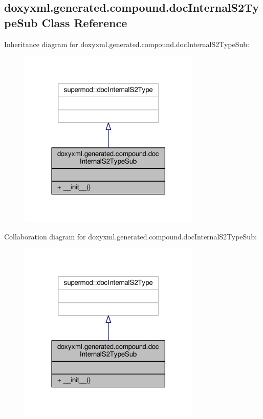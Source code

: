 \subsection{doxyxml.\+generated.\+compound.\+doc\+Internal\+S2\+Type\+Sub Class Reference}
\label{classdoxyxml_1_1generated_1_1compound_1_1docInternalS2TypeSub}


Inheritance diagram for doxyxml.\+generated.\+compound.\+doc\+Internal\+S2\+Type\+Sub\+:
\nopagebreak
\begin{figure}[H]
\begin{center}
\leavevmode
\includegraphics[width=246pt]{d0/db5/classdoxyxml_1_1generated_1_1compound_1_1docInternalS2TypeSub__inherit__graph}
\end{center}
\end{figure}


Collaboration diagram for doxyxml.\+generated.\+compound.\+doc\+Internal\+S2\+Type\+Sub\+:
\nopagebreak
\begin{figure}[H]
\begin{center}
\leavevmode
\includegraphics[width=246pt]{db/d6c/classdoxyxml_1_1generated_1_1compound_1_1docInternalS2TypeSub__coll__graph}
\end{center}
\end{figure}
